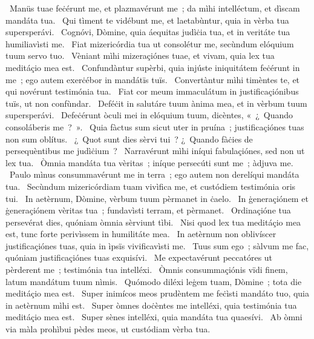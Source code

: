 \psalmBeginDivision
{%
~Manüs tuae feċérunt me, et plazmavérunt me~; da mìhi intelléctum, et dìscam mandáta tua.
~Qui tìment te vidébunt me, et laetabùntur, quia in vèrba tua supersperávi.
~Cognóvi, Dòmine, quia áequitas judìċia tua, et in veritáte tua humiliavìsti me.
~Fiat mizericórdia tua ut consolétur me, secùndum elóquium tuum servo tuo.
~Vèniant mìhi mizeraçiónes tuae, et vivam, quia lex tua meditáçio mea est.
~Confundàntur supèrbi, quia injúste iniquitátem feċérunt in me~; ego autem exerċébor in mandátïs tuïs.
~Convertàntur mìhi timèntes te, et qui novérunt testimónia tua.
~Fiat cor meum immaculátum in justificaçiónibus tuïs, ut non confùndar.
~Deféċit in salutáre tuum ànima mea, et in vèrbum tuum supersperávi.
~Defeċérunt òculi mei in elóquium tuum, dicèntes, «~¿~Quando consoláberis me~?~».
~Quia fàctus sum sicut uter in pruína~; justificaçiónes tuas non sum oblítus.
~¿~Quot sunt dies sèrvi tui~? ¿~Quando fàċies de persequèntibus me judìċium~?
~Narravérunt mìhi iníqui fabulaçiónes, sed non ut lex tua.
~Òmnia mandáta tua vèritas~; iníque persecúti sunt me~; àdjuva me.
~Paulo mìnus consummavérunt me in terra~; ego autem non derelíqui mandáta tua.
~Secùndum mizericórdiam tuam vivìfica me, et custódiem testimónia oris tui.
~In aetèrnum, Dòmine, vèrbum tuum pèrmanet in ċaelo.
~In ġeneraçiónem et ġeneraçiónem vèritas tua~; fundavìsti terram, et pèrmanet.
~Ordinaçióne tua persevérat dies, quóniam òmnia sèrviunt tìbi.
~Nisi quod lex tua meditáçio mea est, tunc forte perivìssem in humilitáte mea.
~In aetèrnum non oblivíscer justificaçiónes tuas, quia in ìpsïs vivificavìsti me.
~Tuus sum ego~; sàlvum me fac, quóniam justificaçiónes tuas exquisívi.
~Me expectavérunt peccatóres ut pèrderent me~; testimónia tua intelléxi.
~Òmnis consummaçiónis vïdi finem, latum mandátum tuum nìmis.
~Quómodo diléxi leġem tuam, Dòmine~; tota die meditáçio mea est.
~Super inimícos meos prudèntem me feċìsti mandáto tuo, quia in aetèrnum mìhi est.
~Super òmnes doċèntes me intelléxi, quia testimónia tua meditáçio mea est.
~Super sènes intelléxi, quia mandáta tua quaesívi.
~Ab òmni via màla prohìbui pèdes meos, ut custódiam vèrba tua.
}
